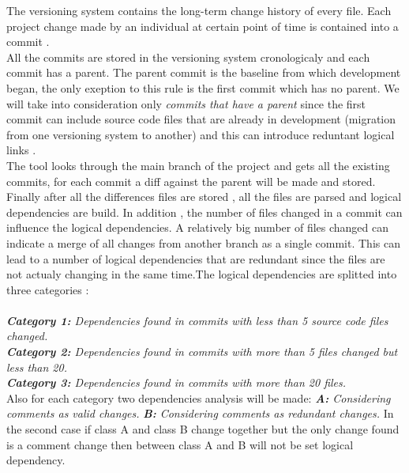 \tab The versioning system contains the long-term change history of every file. Each project change made by an individual at certain point of time is contained into a commit \cite{ct7}.\\ 
All the commits are stored in the versioning system cronologicaly and each commit has a parent. The parent commit is the baseline from which development began, the only exeption to this rule is the first commit which has no parent. We will take into consideration only \textit{commits that have a parent} since the first commit can include source code files that are already in development (migration from one versioning system to another) and this can introduce reduntant logical links \cite{ct8} .
\\ The tool looks through the main branch of the project and gets all the existing commits, for each commit a diff against the parent will be made and stored.\\ Finally after all the differences files are stored , all the files are parsed and logical dependencies are build. In addition , the number of files changed in a commit can influence the logical dependencies. A relatively big number of files changed can indicate a merge of all changes from another branch as a single commit. This can lead to a number of logical dependencies that are redundant since the files are not actualy changing in the same time.The logical dependencies are splitted into three categories :\\ \\
\textit{\textbf{Category 1:} Dependencies found in commits with less than 5 source code files changed.}\\
\textit{\textbf{Category 2:} Dependencies found in commits with more than 5 files changed but less than 20. }\\
\textit{\textbf{Category 3:} Dependencies found in commits with more than 20 files.}\\

Also for each category two dependencies analysis will be made:
\textit{\textbf{A:} Considering comments  as valid changes.}
\textit{\textbf{B:} Considering comments  as redundant changes. }
In the second case if class A and class B change together but the only change found is a comment change then between class A and B will not be set logical dependency.
